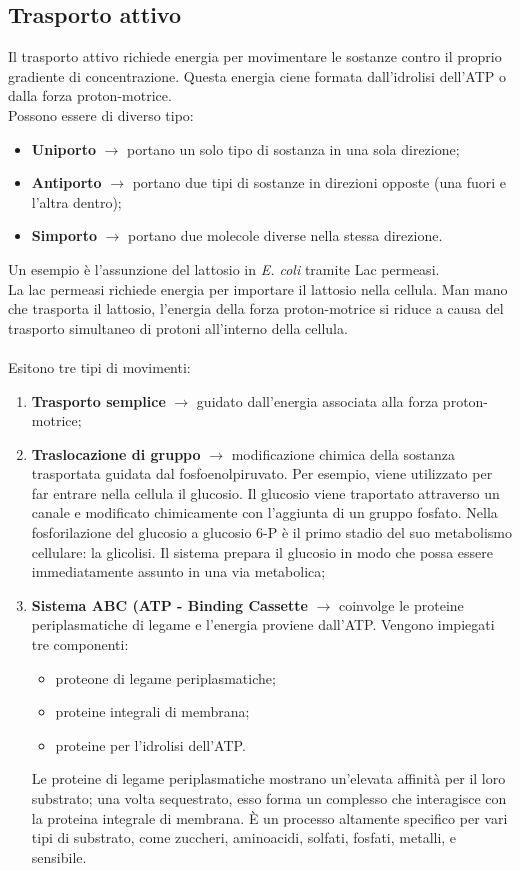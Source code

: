 \subsection{Trasporto attivo}
Il trasporto attivo richiede energia per movimentare le sostanze contro il proprio gradiente di concentrazione. Questa energia ciene formata dall'idrolisi dell'ATP o dalla forza proton-motrice. 
\\Possono essere di diverso tipo:
\begin{itemize}
    \item \textbf{Uniporto} $\xrightarrow{}$ portano un solo tipo di sostanza in una sola direzione; 
    \item \textbf{Antiporto} $\xrightarrow{}$ portano due tipi di sostanze in direzioni opposte (una fuori e l'altra dentro); 
    \item \textbf{Simporto} $\xrightarrow{}$ portano due molecole diverse nella stessa direzione.
\end{itemize}
Un esempio \`e l'assunzione del lattosio in \textit{E. coli} tramite Lac permeasi. 
\\La lac permeasi richiede energia per importare il lattosio nella cellula. Man mano che trasporta il lattosio, l'energia della forza proton-motrice si riduce a causa del trasporto simultaneo di protoni all'interno della cellula.
\\\\Esitono tre tipi di movimenti: 
\begin{enumerate}
    \item \textbf{Trasporto semplice} $\xrightarrow{}$ guidato dall'energia associata alla forza proton-motrice; 
    \item \textbf{Traslocazione di gruppo} $\xrightarrow{}$ modificazione chimica della sostanza trasportata guidata dal fosfoenolpiruvato. Per esempio, viene utilizzato per far entrare nella cellula il glucosio. Il glucosio viene traportato attraverso un canale e modificato chimicamente con l'aggiunta di un gruppo fosfato. Nella fosforilazione del glucosio a glucosio 6-P \`e il primo stadio del suo metabolismo cellulare: la glicolisi. Il sistema prepara il glucosio in modo che possa essere immediatamente assunto in una via metabolica; 
    \item \textbf{Sistema ABC (ATP - Binding Cassette} $\xrightarrow{}$ coinvolge le proteine periplasmatiche di legame e l'energia proviene dall'ATP. Vengono impiegati tre componenti:
    \begin{itemize}
        \item proteone di legame periplasmatiche; 
        \item proteine integrali di membrana; 
        \item proteine per l'idrolisi dell'ATP.
    \end{itemize}
    Le proteine di legame periplasmatiche mostrano un'elevata affinit\`a per il loro substrato; una volta sequestrato, esso forma un complesso che interagisce con la proteina integrale di membrana. \`E un processo altamente specifico per vari tipi di substrato, come zuccheri, aminoacidi, solfati, fosfati, metalli, e sensibile.
\end{enumerate}
